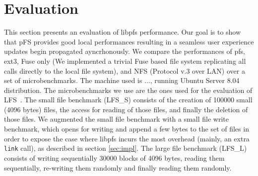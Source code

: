 
\section{Evaluation}
\label{sec:eval}

%

This section presents an evaluation of libpfs performance. Our goal is
to show that pFS provides good local performances resulting in a
seamless user experience updates begin propagated
ayncrhonously. We compare the performances of pfs, ext3, Fuse only (We
implemented a trivial Fuse based file system replicating all calls
directly to the local file system), and NFS (Protocol v.3 over LAN)
over a set of microbenchmarks. The machine used is ..., running Ubuntu
Server 8.04 distribution.  The microbenchmarks we use are the ones used
for the evaluation of LFS~\cite{rosenblum:lfs}. The small file
benchmark (LFS\_S) consists of the creation of 100000 small (4096 bytes)
files, the access for reading of those files, and finally the deletion
of those files. We augmented the small file benchmark with a small file
write benchmark, which opens for writing and append a few bytes to the
set of files in order to expose the case where libpfs incurs the
most overhead (mainly, an extra {\tt link} call), as described in
section \ref{sec:impl}. The large file benchmark (LFS\_L) consists of
writing sequentially 30000 blocks of 4096 bytes, reading them
sequentially, re-writing them randomly and finally reading them
randomly.





\endinput

The actual implementation of pFS does not focus on performance. The
way pFS has been designed would be really adapted to a log-structured
file system. We believe that it is possible drastically improve the
performance by implementing pFS as a log-structured file-system.

